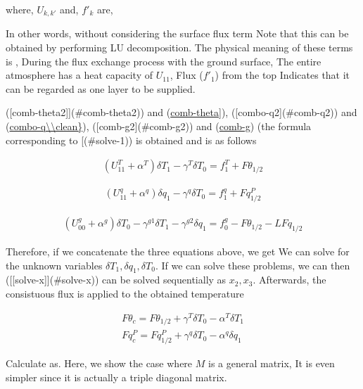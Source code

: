 where, \(U_{k,k'}\) and, \(f'_k\) are,

In other words, without considering the surface flux term Note that this
can be obtained by performing LU decomposition. The physical meaning of
these terms is , During the flux exchange process with the ground
surface, The entire atmosphere has a heat capacity of \(U_{11}\), Flux
(\(f'_1\)) from the top Indicates that it can be regarded as one layer
to be supplied.

({[}comb-theta2{]}{]}(\#comb-theta2)) and
(\protect\hyperlink{comb-theta}{comb-theta{]}}),
({[}combo-q2{]}(\#comb-q2)) and
(\protect\hyperlink{comb-q}{combo-q\textbackslash\textbackslash clean\}}),
({[}comb-g2{]}(\#comb-g2)) and (\protect\hyperlink{comb-g}{comb-g}) (the
formula corresponding to {[}\ltra[solve-1\end{eqnarray}](\#solve-1)) is obtained and
is as follows

\begin{eqnarray}
  ( U^{T}_{11} +  \alpha^{T}  ) \delta T_1 - \gamma^{T} \delta T_0 
      = f^{T}_1 + F\theta_{1/2}
\end{eqnarray}

\begin{eqnarray}
  ( U^{q}_{11} +  \alpha^{q}  ) \delta q_1 - \gamma^{q} \delta T_0
      = f^{q}_1 + Fq^P_{1/2}
\end{eqnarray}

\begin{eqnarray}
  ( U^{g}_{00} +  \alpha^{g}  ) \delta T_0 - \gamma^{g1} \delta T_1
                                           - \gamma^{g2} \delta q_1
      = f^{g}_0 - F\theta_{1/2} - L Fq_{1/2}
\end{eqnarray}

Therefore, if we concatenate the three equations above, we get We can
solve for the unknown variables \(\delta T_1, \delta q_1, \delta T_0\).
If we can solve these problems, we can then
({[}{[}solve-x{]}{]}(\#solve-x)) can be solved sequentially as
\(x_2,x_3\). Afterwards, the consistuous flux is applied to the obtained
temperature

\begin{eqnarray}
  F\theta_c  =  F\theta_{1/2} 
                   + \gamma^{T} \delta T_0 -\alpha^{T} \delta T_1 \\
  Fq^P_c  =  Fq^P_{1/2} 
                   + \gamma^{q} \delta T_0 -\alpha^{q} \delta q_1
\end{eqnarray}

Calculate as. Here, we show the case where \(M\) is a general matrix, It
is even simpler since it is actually a triple diagonal matrix.

